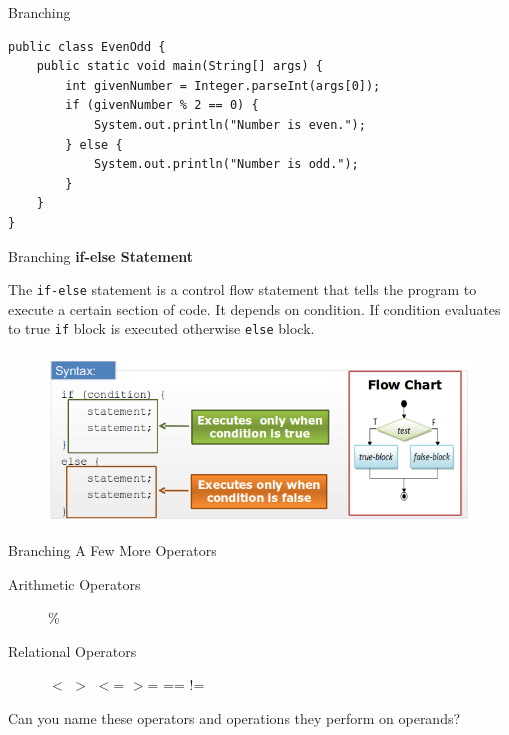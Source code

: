 \documentclass[12pt]{beamer}
\begin{document}
\begin{frame}[fragile]{Branching}
 \begin{lstlisting}[numbers=none]
public class EvenOdd {
    public static void main(String[] args) {
        int givenNumber = Integer.parseInt(args[0]);
        if (givenNumber % 2 == 0) {
            System.out.println("Number is even.");
        } else {
            System.out.println("Number is odd.");
        }
    }
}
 \end{lstlisting}
\end{frame}

\begin{frame}{Branching}
 \textbf{if-else Statement}
 
  The \lstinline!if-else! statement is a control flow statement that tells the program to execute a certain section of code. It depends on condition. If condition evaluates to true \lstinline!if! block is executed otherwise \lstinline!else! block.
  \begin{figure}[H]
   \begin{center}
    \includegraphics[scale=.45]{branching-if-else-syntax.png}
   \end{center}
  \end{figure}
\end{frame}

\begin{frame}{Branching}
 A Few More Operators
 
 \begin{description}
  \item [Arithmetic Operators] \%
  \item [Relational Operators] $<$ \hspace{.6cm}$>$ \hspace{.6cm}$<$= \hspace{.6cm}$>$= \hspace{.6cm}== \hspace{.6cm}!=
 \end{description}

 Can you name these operators and operations they perform on operands?
\end{frame}
\end{document}
